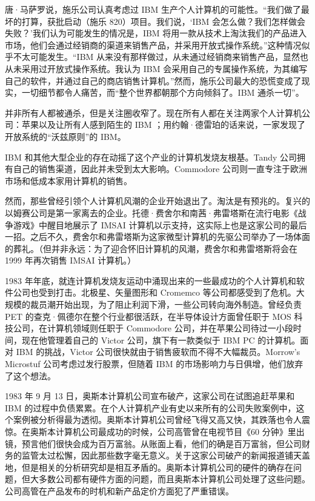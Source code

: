 \documentclass[12pt,UTF8]{ctexbook}
\begin{document}
唐·马萨罗说，施乐公司认真考虑过 IBM 生产个人计算机的可能性。“我们做了最坏的打算，获批启动（施乐 820）项目。我们说，‘IBM 会怎么做？我们怎样做会失败？’我们认为可能发生的情况是，IBM 将用一款从技术上淘汰我们的产品进入市场，他们会通过经销商的渠道来销售产品，并采用开放式操作系统。”这种情况似乎不太可能发生。“IBM 从来没有那样做过，从未通过经销商来销售产品，显然也从未采用过开放式操作系统。我认为 IBM 会采用自己的专属操作系统，为其编写自己的软件，并通过自己的商店销售计算机。”然而，施乐公司最大的恐慌变成了现实，一切细节都令人痛苦，而“整个世界都朝那个方向倾斜了。IBM 通杀一切”。

并非所有人都被通杀，但是关注圈收窄了。现在所有人都在关注两家个人计算机公司：苹果以及让所有人感到陌生的 IBM ；用约翰·德雷珀的话来说，一家发现了开放系统的“沃兹原则”的 IBM。

IBM 和其他大型企业的存在动摇了这个产业的计算机发烧友根基。Tandy 公司拥有自己的销售渠道，因此并未受到太大影响。Commodore 公司则一直专注于欧洲市场和低成本家用计算机的销售。

然而，那些曾经引领个人计算机风潮的企业开始退出了。淘汰是有预兆的。复兴的以姆赛公司是第一家离去的企业。托德·费舍尔和南茜·弗雷塔斯在流行电影《战争游戏》中醒目地展示了 IMSAI 计算机以示支持，这实际上也是这家公司的最后一招。之后不久，费舍尔和弗雷塔斯为这家微型计算机的先驱公司举办了一场体面的葬礼。（但并非永远：为了迎合怀旧计算机的风潮，费舍尔和弗雷塔斯将会在 1999 年再次销售 IMSAI 计算机。）

1983 年年底，就连计算机发烧友运动中涌现出来的一些最成功的个人计算机和软件公司也受到打击。北极星、矢量图形和 Cromemco 等公司都感受到了危机。大规模的裁员潮开始出现，为了阻止利润下滑，一些公司转向海外制造。曾经负责 PET 的查克·佩德尔在整个行业都很活跃，在半导体设计方面曾任职于 MOS 科技公司，在计算机领域则任职于 Commodore 公司，并在苹果公司待过一小段时间，现在他管理着自己的 Victor 公司，旗下有一款类似于 IBM PC 的计算机。面对 IBM 的挑战，Victor 公司很快就由于销售疲软而不得不大幅裁员。Morrow's Microstuf 公司考虑过发行股票，但随着 IBM 的市场影响力与日俱增，他们放弃了这个想法。

1983 年 9 月 13 日，奥斯本计算机公司宣布破产，这家公司在试图追赶苹果和 IBM 的过程中负债累累。在个人计算机产业有史以来所有的公司失败案例中，这个案例被分析得最为透彻。奥斯本计算机公司曾经飞得又高又快，其跌落也令人震惊。在奥斯本计算机公司最成功的时候，公司高管曾在电视节目《60 分钟》里出镜，预言他们很快会成为百万富翁。从账面上看，他们的确是百万富翁，但公司财务的监管太过松懈，因此那些数字毫无意义。关于这家公司破产的新闻报道铺天盖地，但是相关的分析研究却是相互矛盾的。奥斯本计算机公司的硬件的确存在问题，但大多数公司都有硬件方面的问题，而且奥斯本计算机公司处理了这些问题。公司高管在产品发布的时机和新产品定价方面犯了严重错误。
\end{document}

